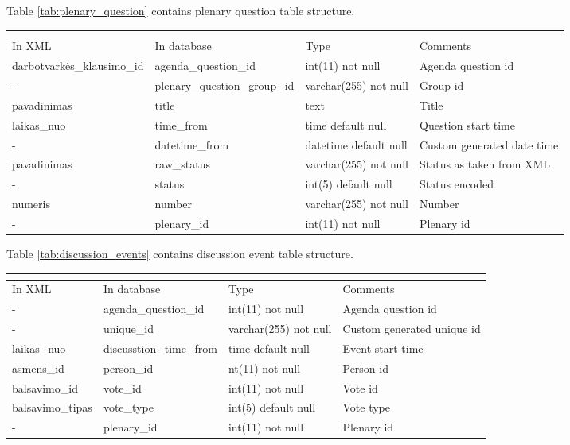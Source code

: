 \documentclass[a4paper,12pt]{article}
\begin{document}
	\noindent
	Table \ref{tab:plenary_question} contains plenary question table structure.
	\begin{center}
		\begin{tabular}{L{3cm} L{4.2cm} L{3cm} L{2.5cm}}
			\\ 
			\hline
			In XML & In database & Type & Comments\\
			\hline
			darbotvarkės\_klausimo\_id & agenda\_question\_id & int(11) not null & Agenda question id\\
			- & plenary\_question\_group\_id & varchar(255) not null & Group id\\
			pavadinimas & title & text & Title \\
			laikas\_nuo & time\_from & time default null &  Question start time \\
			- & datetime\_from & datetime default null & Custom generated date time \\
			pavadinimas & raw\_status & varchar(255) not null & Status as taken from XML \\
			- & status & int(5) default null & Status encoded \\
			numeris & number & varchar(255) not null & Number \\
			- & plenary\_id & int(11) not null & Plenary id\\				                                    
			\hline
		\end{tabular}
		 \label{tab:plenary_question}
	\end{center}
	
	\hfill
	
	\noindent
	Table \ref{tab:discussion_events} contains discussion event table structure.
	\begin{center}
		\begin{tabular}{L{3cm} L{4.2cm} L{3cm} L{2.5cm}}
			\\ 
			\hline
			In XML & In database & Type & Comments\\
			\hline
			- & agenda\_question\_id & int(11) not null & Agenda question id\\
			- & unique\_id & varchar(255) not null & Custom generated unique id\\
			laikas\_nuo & discusstion\_time\_from & time default null &  Event start time \\
			asmens\_id & person\_id & nt(11) not null & Person id\\
			balsavimo\_id & vote\_id & int(11) not null & Vote id\\
			balsavimo\_tipas & vote\_type & int(5) default null & Vote type \\
			- & plenary\_id & int(11) not null & Plenary id\\				                                    
			\hline
		\end{tabular}
		 \label{tab:discussion_events}
	\end{center}
	
\end{document}
